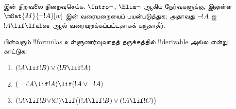 \documentclass[../../../include/open-logic-section]{subfiles}
\begin{document}
\begin{prob}
   இன் நிறுவலை நிறைவுசெய்க.
  $\Intro\lnot$, $\Elim\lnot$ ஆகிய நேர்வுகளுக்கு,
   இலுள்ள
  $\mSat{M}{\lnot !A}[w]$ இன் வரையறையைப் பயன்படுத்துக; அதாவது
  $\lnot !A$ ஐ $!A \lif \lfalse$ ஆல் வரையறுக்கப்பட்டதாகக் கருதாதீர்.
\end{prob}

\begin{prob}
  பின்வரும் !!{formula}s உள்ளுணர்வுவாதத் தருக்கத்தில் !!{derivable} அல்ல
  என்று காட்டுக:
  \begin{enumerate}
    \item $(!A \lif !B) \lor (!B \lif !A)$
    \item $(\lnot\lnot !A \lif !A) \lif (!A \lor \lnot !A)$
    \item $(!A \lif !B \lor !C) \lif \bigl((!A \lif !B)\lor(!A \lif !C)\bigr)$
  \end{enumerate}
\end{prob}
\end{document}
